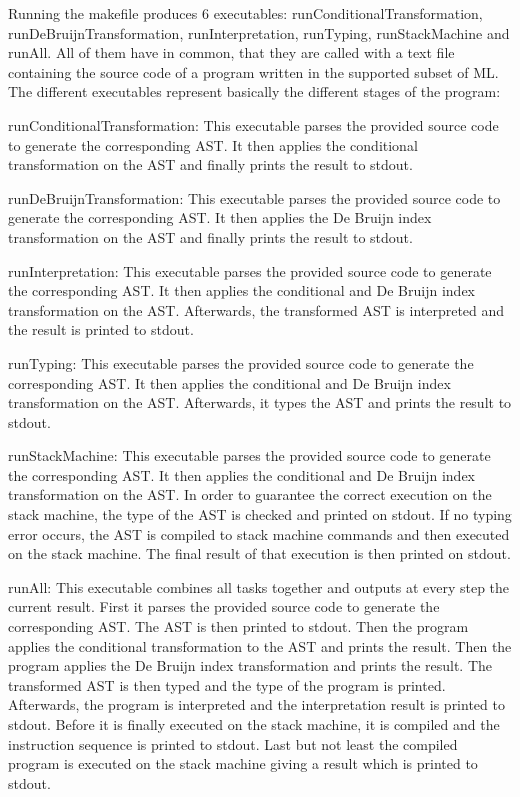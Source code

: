 \documentclass[a4paper, 12pt, titlepage]{article}
\begin{document}
Running the makefile produces 6 executables: runConditionalTransformation, runDeBruijnTransformation, runInterpretation, runTyping, runStackMachine and runAll. All of them have in common, that they are called with a text file containing the source code of a program written in the supported subset of ML. The different executables represent basically the different stages of the program:

runConditionalTransformation: This executable parses the provided source code to generate the corresponding AST. It then applies the conditional transformation on the AST and finally prints the result to stdout.

runDeBruijnTransformation: This executable parses the provided source code to generate the corresponding AST. It then applies the De Bruijn index transformation on the AST and finally prints the result to stdout.

runInterpretation: This executable parses the provided source code to generate the corresponding AST. It then applies the conditional and De Bruijn index transformation on the AST. Afterwards, the transformed AST is interpreted and the result is printed to stdout.

runTyping: This executable parses the provided source code to generate the corresponding AST. It then applies the conditional and De Bruijn index transformation on the AST. Afterwards, it types the AST and prints the result to stdout.

runStackMachine: This executable parses the provided source code to generate the corresponding AST. It then applies the conditional and De Bruijn index transformation on the AST. In order to guarantee the correct execution on the stack machine, the type of the AST is checked and printed on stdout. If no typing error occurs, the AST is compiled to stack machine commands and then executed on the stack machine. The final result of that execution is then printed on stdout.

runAll: This executable combines all tasks together and outputs at every step the current result. First it parses the provided source code to generate the corresponding AST. The AST is then printed to stdout. Then the program applies the conditional transformation to the AST and prints the result. Then the program applies the De Bruijn index transformation and prints the result. The transformed AST is then typed and the type of the program is printed. Afterwards, the program is interpreted and the interpretation result is printed to stdout. Before it is finally executed on the stack machine, it is compiled and the instruction sequence is printed to stdout. Last but not least the compiled program is executed on the stack machine giving a result which is printed to stdout.
 
\end{document}
